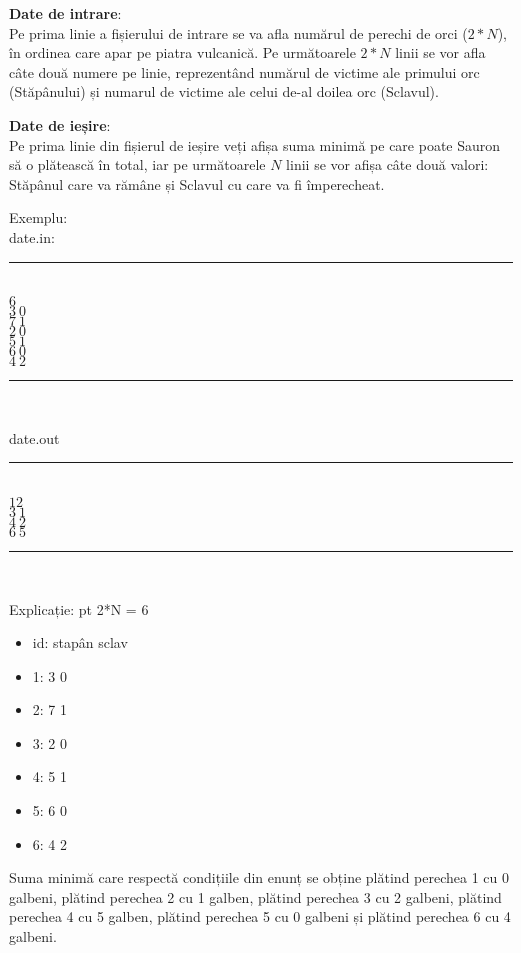 \documentclass[a4paper,5pt]{article}
\begin{document}
\textbf{Date de intrare}: \\
Pe prima linie a fișierului de intrare se va afla numărul de perechi de orci 
($2*N$), în ordinea care apar pe piatra vulcanică.
Pe următoarele $2*N$ linii se vor afla câte două numere
pe linie, reprezentând numărul de victime ale primului orc (Stăpânului) și
numarul de victime ale celui de-al doilea orc (Sclavul).

\textbf{Date de ieșire}: \\
Pe prima linie din fișierul de ieșire veți afișa suma minimă pe care poate Sauron să o 
plătească în total, iar pe următoarele $N$ linii se vor afișa câte două valori:
Stăpânul care va rămâne și Sclavul cu care va fi împerecheat.

Exemplu: \\
date.in: \\
\rule{50mm}{0.1mm}\\
\noindent
$6$ \\
$3\ 0$ \\
$7\ 1$ \\
$2\ 0$ \\
$5\ 1$ \\ 
$6\ 0$ \\
$4\ 2$ \\
\rule{50mm}{0.1mm}\\
\indent

date.out \\
\rule{50mm}{0.1mm}\\
\noindent
$12$ \\
$3\ 1$ \\
$4\ 2$ \\
$6\ 5$ \\
\rule{50mm}{0.1mm}\\
\indent

Explicație:
pt 2*N = 6
\begin{itemize}
	\item id: stapân sclav
	\item 1: 3 0
	\item 2: 7 1
	\item 3: 2 0
	\item 4: 5 1
	\item 5: 6 0
	\item 6: 4 2
\end{itemize}

Suma minimă care respectă condițiile din enunț se obține plătind perechea 1 cu 
0 galbeni, plătind perechea 2 cu 1 galben, plătind perechea 3 cu 2 galbeni, 
plătind perechea 4 cu 5 galben, plătind perechea 5 cu 0 galbeni și plătind 
perechea 6 cu 4 galbeni.
\end{document}
